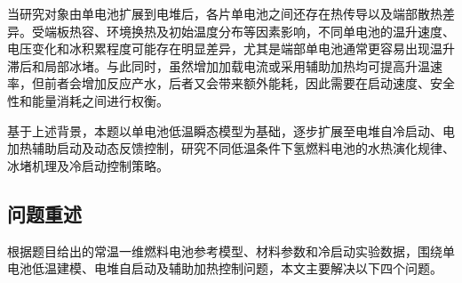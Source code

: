 \documentclass[bwprint]{gmcmthesis}
\numberwithin{figure}{section}
\begin{document}
当研究对象由单电池扩展到电堆后，各片单电池之间还存在热传导以及端部散热差异。受端板热容、环境换热及初始温度分布等因素影响，不同单电池的温升速度、电压变化和冰积累程度可能存在明显差异，尤其是端部单电池通常更容易出现温升滞后和局部冰堵。与此同时，虽然增加加载电流或采用辅助加热均可提高升温速率，但前者会增加反应产水，后者又会带来额外能耗，因此需要在启动速度、安全性和能量消耗之间进行权衡。

基于上述背景，本题以单电池低温瞬态模型为基础，逐步扩展至电堆自冷启动、电加热辅助启动及动态反馈控制，研究不同低温条件下氢燃料电池的水热演化规律、冰堵机理及冷启动控制策略。

\subsection{问题重述}
根据题目给出的常温一维燃料电池参考模型、材料参数和冷启动实验数据，围绕单电池低温建模、电堆自启动及辅助加热控制问题，本文主要解决以下四个问题。
\end{document}
